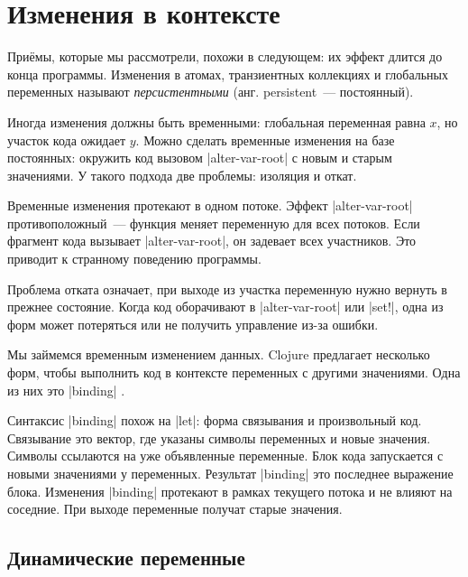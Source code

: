 \section{Изменения в контексте}


При\"{е}мы, которые мы рассмотрели, похожи в следующем: их эффект длится до конца
программы. Изменения в атомах, транзиентных коллекциях и глобальных переменных
называют \emph{персистентными} (анг. persistent~--- постоянный).

Иногда изменения должны быть временными: глобальная переменная равна $x$, но
участок кода ожидает $y$. Можно сделать временные изменения на базе постоянных:
окружить код вызовом \spverb|alter-var-root| с новым и старым значениями. У
такого подхода две проблемы: изоляция и откат.


Временные изменения протекают в одном потоке. Эффект \spverb|alter-var-root|
противоположный~--- функция меняет переменную для всех потоков. Если фрагмент
кода вызывает \spverb|alter-var-root|, он задевает всех участников. Это приводит
к странному поведению программы.

Проблема отката означает, при выходе из участка переменную нужно вернуть в
прежнее состояние. Когда код оборачивают в \spverb|alter-var-root| или
\spverb|set!|, одна из форм может потеряться или не получить управление из-за
ошибки.

Мы займемся временным изменением данных. Clojure предлагает несколько форм,
чтобы выполнить код в контексте переменных с другими значениями. Одна из них это
\spverb|binding| .


Синтаксис \spverb|binding| похож на \spverb|let|: форма связывания и
произвольный код. Связывание это вектор, где указаны символы переменных и новые
значения. Символы ссылаются на уже объявленные переменные. Блок кода запускается
с новыми значениями у переменных. Результат \spverb|binding| это последнее
выражение блока. Изменения \spverb|binding| протекают в рамках текущего потока и
не влияют на соседние. При выходе переменные получат старые значения.

\subsection{Динамические переменные}

